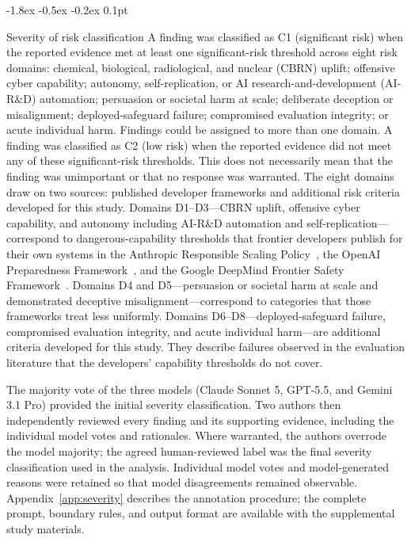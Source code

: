 \documentclass{article}
\makeatletter
\renewcommand{\subsection}{%
  \@startsection{subsection}{2}{\z@}%
                {-1.8ex \@plus -0.5ex \@minus -0.2ex}%
                {0.1pt}%
                {\normalsize\bf\raggedright}%
}
\makeatother
\begin{document}
\subsection{Severity of risk classification}\label{sec:severity}
A finding was classified as C1 (significant risk) when the reported evidence met at least one significant-risk threshold across eight risk domains: chemical, biological, radiological, and nuclear (CBRN) uplift; offensive cyber capability; autonomy, self-replication, or AI research-and-development (AI-R\&D) automation; persuasion or societal harm at scale; deliberate deception or misalignment; deployed-safeguard failure; compromised evaluation integrity; or acute individual harm. Findings could be assigned to more than one domain. A finding was classified as C2 (low risk) when the reported evidence did not meet any of these significant-risk thresholds. This does not necessarily mean that the finding was unimportant or that no response was warranted. The eight domains draw on two sources: published developer frameworks and additional risk criteria developed for this study. Domains D1--D3---CBRN uplift, offensive cyber capability, and autonomy including AI-R\&D automation and self-replication---correspond to dangerous-capability thresholds that frontier developers publish for their own systems in the Anthropic Responsible Scaling Policy~\citep{anthropic2026rsp}, the OpenAI Preparedness Framework~\citep{openai2025preparedness}, and the Google DeepMind Frontier Safety Framework~\citep{deepmind2026fsf}. Domains D4 and D5---persuasion or societal harm at scale and demonstrated deceptive misalignment---correspond to categories that those frameworks treat less uniformly. Domains D6--D8---deployed-safeguard failure, compromised evaluation integrity, and acute individual harm---are additional criteria developed for this study. They describe failures observed in the evaluation literature that the developers' capability thresholds do not cover.

The majority vote of the three models (Claude Sonnet 5, GPT-5.5, and Gemini 3.1 Pro) provided the initial severity classification. Two authors then independently reviewed every finding and its supporting evidence, including the individual model votes and rationales. Where warranted, the authors overrode the model majority; the agreed human-reviewed label was the final severity classification used in the analysis. Individual model votes and model-generated reasons were retained so that model disagreements remained observable. Appendix~\ref{app:severity} describes the annotation procedure; the complete prompt, boundary rules, and output format are available with the supplemental study materials.
\end{document}
